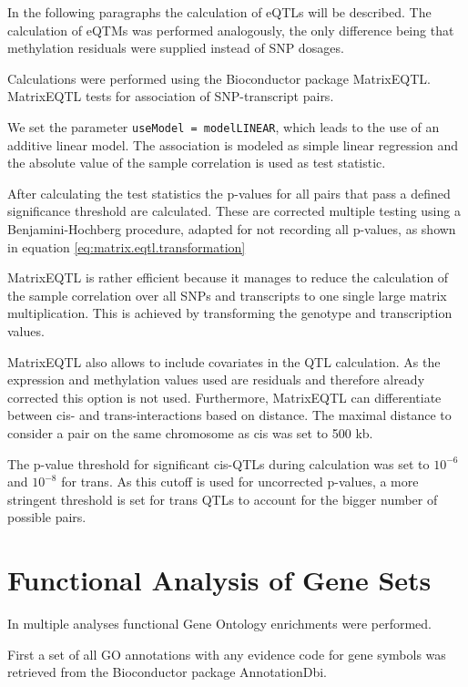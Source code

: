 \documentclass[a4paper,12pt,twoside,openright]{report}
\begin{document}
In the following paragraphs the calculation of eQTLs will be described. The calculation of eQTMs was performed analogously, the only difference being that methylation residuals were supplied instead of SNP dosages.

Calculations were performed using the Bioconductor package MatrixEQTL\cite{10.1093/bioinformatics/bts163}. MatrixEQTL tests for association of SNP-transcript pairs.  

We set the parameter \texttt{useModel = modelLINEAR}, which leads to the use of an  additive linear model. The association is modeled as simple linear regression and the absolute value of the sample correlation is used as test statistic.

After calculating the test statistics the p-values for all pairs that pass a defined significance threshold are calculated. These are corrected multiple testing using a Benjamini-Hochberg procedure\cite{10.2307/2346101}, adapted for not recording all p-values, as shown in equation \ref{eq:matrix.eqtl.transformation}

MatrixEQTL is rather efficient because it manages to reduce the calculation of the sample correlation over all SNPs and transcripts to one single large matrix multiplication. This is achieved by transforming the genotype and transcription values. 

MatrixEQTL also allows to include covariates in the QTL calculation. As the expression and methylation values used are residuals and therefore already corrected this option is not used. Furthermore, MatrixEQTL can differentiate between cis- and trans-interactions based on distance. The maximal distance to consider a pair on the same chromosome as cis was set to 500 kb. 

The p-value threshold for significant cis-QTLs during calculation was set to $10^{-6}$ and $10^{-8}$ for trans. As this cutoff is used for uncorrected p-values, a more stringent threshold is set for trans QTLs to account for the bigger number of possible pairs. 



\section{Functional Analysis of Gene Sets}
\label{Methods:Functional Analysis of Gene Sets}
In multiple analyses functional Gene Ontology enrichments were performed.

First a set of all GO annotations with any evidence code for gene symbols  was retrieved from the Bioconductor package AnnotationDbi\cite{AnnotationDbi}. 
\end{document}
